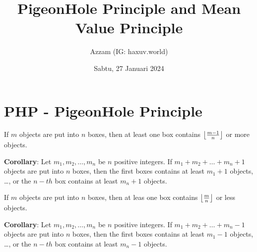 \documentclass[12pt]{scrartcl}
\title{PigeonHole Principle and Mean Value Principle}
\author{Azzam (IG: haxuv.world)}
\date{Sabtu, 27 Januari 2024}
\begin{document}
\maketitle

\renewcommand*\contentsname{Daftar Isi}
\tableofcontents

\newpage
\section{PHP - PigeonHole Principle}
\begin{definition}
     If $m$ objects are put into $n$ boxes, then at least one box contains $\left\lfloor \frac{m-1}{n} \right\rfloor$ or more objects.
\end{definition}

\textbf{Corollary}: Let $m_1, m_2, \dots, m_n$ be $n$ positive integers. If $m_1+m_2+\dots+m_n+1$ objects are put into $n$ boxes, then the first boxes contains at least $m_1+1$ objects, \dots, or the $n-th$ box contains at least $m_n+1$ objects.

\begin{definition}
    If $m$ objects are put into $n$ boxes, then at leas one box contains $\left\lfloor \frac{m}{n} \right\rfloor$ or less objects.
\end{definition}

\textbf{Corollary}: Let $m_1, m_2, \dots, m_n$ be $n$ positive integers. If $m_1+m_2+\dots+m_n-1$ objects are put into $n$ boxes, then the first boxes contains at least $m_1-1$ objects, \dots, or the $n-th$ box contains at least $m_n-1$ objects.
\end{document}
